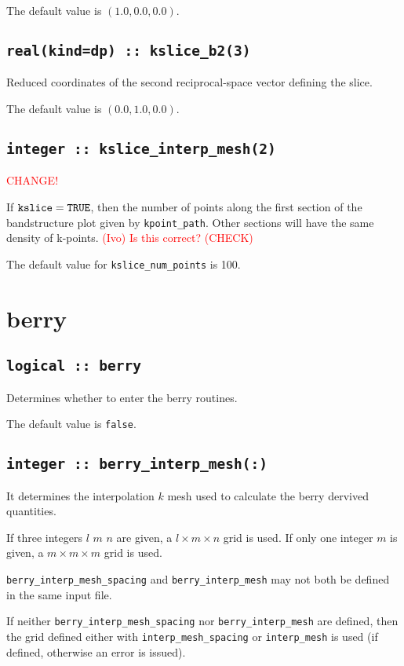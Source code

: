 The default value is $(1.0,0.0,0.0)$.

\subsection[kslice\_corner]{\tt real(kind=dp) :: kslice\_b2(3)}
Reduced coordinates of the second reciprocal-space vector 
defining the slice.

The default value is $(0.0,1.0,0.0)$.

\subsection[kslice\_num\_points]{\tt integer :: kslice\_interp\_mesh(2)}

\textcolor{red}{CHANGE!}

If $\verb#kslice#=\verb#TRUE#$, then the number of points along
the first section of the bandstructure plot given by
\verb#kpoint_path#. Other sections will have the same density of
k-points. \textcolor{red}{(Ivo) Is this correct? (CHECK)}

The default value for \verb#kslice_num_points# is 100.


\clearpage
\section{berry}

\subsection[berry]{\tt logical :: berry}
Determines whether to enter the berry routines.

The default value is \verb#false#.

\subsection[berry\_interp\_mesh]{\tt integer :: berry\_interp\_mesh(:)}
It determines the interpolation $k$ mesh used to calculate the berry
dervived quantities.

If three integers $l$ $m$ $n$ are given, a $l\times m\times n$ grid is used. If only one integer $m$ is given, a $m\times m\times m$ grid is used.

{\tt berry\_interp\_mesh\_spacing} and  {\tt berry\_interp\_mesh} may not both be defined in the same input file.

If neither {\tt berry\_interp\_mesh\_spacing} nor  {\tt berry\_interp\_mesh} are defined, then the grid defined either with {\tt interp\_mesh\_spacing} or {\tt interp\_mesh} is used (if defined, otherwise an error is issued).

